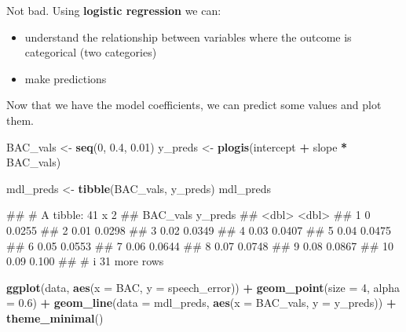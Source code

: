 \documentclass[
]{book}
\newenvironment{Shaded}{\begin{snugshade}}{\end{snugshade}}
\newcommand{\AttributeTok}[1]{\textcolor[rgb]{0.13,0.29,0.53}{#1}}
\newcommand{\DecValTok}[1]{\textcolor[rgb]{0.00,0.00,0.81}{#1}}
\newcommand{\FloatTok}[1]{\textcolor[rgb]{0.00,0.00,0.81}{#1}}
\newcommand{\FunctionTok}[1]{\textcolor[rgb]{0.13,0.29,0.53}{\textbf{#1}}}
\newcommand{\NormalTok}[1]{#1}
\newcommand{\OtherTok}[1]{\textcolor[rgb]{0.56,0.35,0.01}{#1}}
\newcommand{\SpecialCharTok}[1]{\textcolor[rgb]{0.81,0.36,0.00}{\textbf{#1}}}
\providecommand{\tightlist}{%
  \setlength{\itemsep}{0pt}\setlength{\parskip}{0pt}}
\begin{document}
Not bad. Using \textbf{logistic regression} we can:

\begin{itemize}
\tightlist
\item
  understand the relationship between variables where the outcome is categorical (two categories)
\item
  make predictions
\end{itemize}

Now that we have the model coefficients, we can predict some values and plot them.

\begin{Shaded}
\begin{Highlighting}[]
\NormalTok{BAC\_vals }\OtherTok{\textless{}{-}} \FunctionTok{seq}\NormalTok{(}\DecValTok{0}\NormalTok{, }\FloatTok{0.4}\NormalTok{, }\FloatTok{0.01}\NormalTok{)}
\NormalTok{y\_preds }\OtherTok{\textless{}{-}} \FunctionTok{plogis}\NormalTok{(intercept }\SpecialCharTok{+}\NormalTok{ slope }\SpecialCharTok{*}\NormalTok{ BAC\_vals)}

\NormalTok{mdl\_preds }\OtherTok{\textless{}{-}} \FunctionTok{tibble}\NormalTok{(BAC\_vals, y\_preds)}
\NormalTok{mdl\_preds}
\end{Highlighting}
\end{Shaded}

\begin{Shaded}
\begin{Highlighting}[]
\NormalTok{\#\# \# A tibble: 41 x 2}
\NormalTok{\#\#    BAC\_vals y\_preds}
\NormalTok{\#\#       \textless{}dbl\textgreater{}   \textless{}dbl\textgreater{}}
\NormalTok{\#\#  1     0     0.0255}
\NormalTok{\#\#  2     0.01  0.0298}
\NormalTok{\#\#  3     0.02  0.0349}
\NormalTok{\#\#  4     0.03  0.0407}
\NormalTok{\#\#  5     0.04  0.0475}
\NormalTok{\#\#  6     0.05  0.0553}
\NormalTok{\#\#  7     0.06  0.0644}
\NormalTok{\#\#  8     0.07  0.0748}
\NormalTok{\#\#  9     0.08  0.0867}
\NormalTok{\#\# 10     0.09  0.100 }
\NormalTok{\#\# \# i 31 more rows}
\end{Highlighting}
\end{Shaded}

\begin{Shaded}
\begin{Highlighting}[]
\FunctionTok{ggplot}\NormalTok{(data, }\FunctionTok{aes}\NormalTok{(}\AttributeTok{x =}\NormalTok{ BAC, }\AttributeTok{y =}\NormalTok{ speech\_error)) }\SpecialCharTok{+}
  \FunctionTok{geom\_point}\NormalTok{(}\AttributeTok{size =} \DecValTok{4}\NormalTok{, }\AttributeTok{alpha =} \FloatTok{0.6}\NormalTok{) }\SpecialCharTok{+}
  \FunctionTok{geom\_line}\NormalTok{(}\AttributeTok{data =}\NormalTok{ mdl\_preds,}
            \FunctionTok{aes}\NormalTok{(}\AttributeTok{x =}\NormalTok{ BAC\_vals, }\AttributeTok{y =}\NormalTok{ y\_preds)) }\SpecialCharTok{+}
  \FunctionTok{theme\_minimal}\NormalTok{()}
\end{Highlighting}
\end{Shaded}
\end{document}
